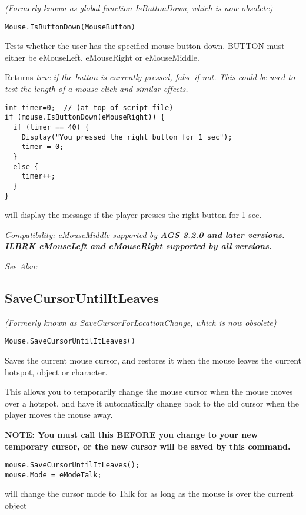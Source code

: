 \it{(Formerly known as global function IsButtonDown, which is now obsolete)}

\begin{verbatim}
Mouse.IsButtonDown(MouseButton)
\end{verbatim}
Tests whether the user has the specified mouse button down. BUTTON must either
be eMouseLeft, eMouseRight or eMouseMiddle.

Returns \it{true} if the button is currently pressed, \it{false} if not. This could be used to
test the length of a mouse click and similar effects.

\begin{verbatim}
int timer=0;  // (at top of script file)
if (mouse.IsButtonDown(eMouseRight)) {
  if (timer == 40) {
    Display("You pressed the right button for 1 sec");
    timer = 0;
  }
  else {
    timer++;
  }
}
\end{verbatim}
will display the message if the player presses the right button for 1 sec.

\it{Compatibility:} \it{eMouseMiddle} supported by \bf{AGS 3.2.0} and later versions. ILBRK
\it{eMouseLeft} and \it{eMouseRight} supported by all versions.

\it{See Also:} 


\subsection{SaveCursorUntilItLeaves}\label{Mouse.SaveCursorUntilItLeaves}%

\it{(Formerly known as SaveCursorForLocationChange, which is now obsolete)}

\begin{verbatim}
Mouse.SaveCursorUntilItLeaves()
\end{verbatim}
Saves the current mouse cursor, and restores it when the mouse leaves the current hotspot,
object or character.

This allows you to temporarily change the mouse cursor when the mouse moves over a hotspot,
and have it automatically change back to the old cursor when the player moves the mouse away.

\bf{NOTE:} You must call this \bf{BEFORE} you change to your new temporary cursor, or the
new cursor will be saved by this command.

\begin{verbatim}
mouse.SaveCursorUntilItLeaves();
mouse.Mode = eModeTalk;
\end{verbatim}
will change the cursor mode to Talk for as long as the mouse is over the current object

